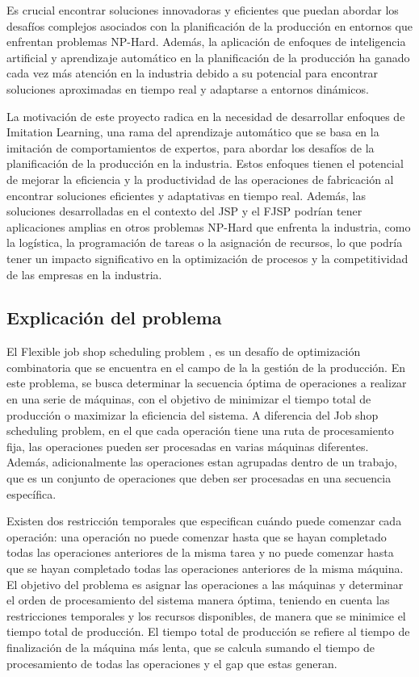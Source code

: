 Es crucial encontrar soluciones innovadoras y eficientes que puedan abordar 
los desafíos complejos asociados con la planificación de la producción en entornos que enfrentan 
problemas NP-Hard. Además, la aplicación de enfoques de inteligencia artificial y aprendizaje 
automático en la planificación de la producción ha ganado cada vez más atención en la industria 
debido a su potencial para encontrar soluciones aproximadas en tiempo real y adaptarse a 
entornos dinámicos.\medskip

La motivación de este proyecto radica en la necesidad de desarrollar enfoques de Imitation 
Learning, una rama del aprendizaje automático que se basa en la imitación de comportamientos 
de expertos, para abordar los desafíos de la planificación de la producción en la industria. 
Estos enfoques tienen el potencial de mejorar la eficiencia y la productividad de las operaciones 
de fabricación al encontrar soluciones eficientes y adaptativas en tiempo real. Además, las 
soluciones desarrolladas en el contexto del JSP y el FJSP podrían tener aplicaciones amplias 
en otros problemas NP-Hard que enfrenta la industria, como la logística, la programación de 
tareas o la asignación de recursos, lo que podría tener un impacto significativo en la 
optimización de procesos y la competitividad de las empresas en la industria.

\subsection{Explicación del problema}
El Flexible job shop scheduling problem , es un desafío de optimización combinatoria 
que se encuentra en el campo de la la gestión de la producción. En este problema, se busca determinar 
la secuencia óptima de operaciones a realizar en una serie de máquinas, con el objetivo de minimizar el 
tiempo total de producción o maximizar la eficiencia del sistema. A diferencia del Job shop scheduling 
problem, en el que cada operación tiene una ruta de procesamiento fija, las operaciones pueden ser 
procesadas en varias máquinas diferentes. Además, adicionalmente las operaciones estan agrupadas 
dentro de un trabajo, que es un conjunto de operaciones que deben ser procesadas en una secuencia
específica.\medskip

Existen dos restricción temporales que especifican cuándo puede comenzar 
cada operación: una operación no puede comenzar hasta que se hayan completado todas las operaciones
anteriores de la misma tarea y no puede comenzar hasta que se hayan completado todas las operaciones
anteriores de la misma máquina. El objetivo del problema es asignar las operaciones a las máquinas y determinar el orden de procesamiento 
del sistema manera óptima, teniendo en cuenta las restricciones temporales y los recursos disponibles, 
de manera que se minimice el tiempo total de producción. El tiempo total de producción se refiere al
tiempo de finalización de la máquina más lenta, que se calcula sumando el tiempo de procesamiento 
de todas las operaciones y el gap que estas generan.\medskip

